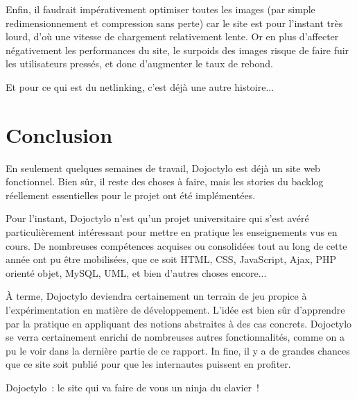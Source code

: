 \documentclass[a4paper,12pt]{article}
\begin{document}
Enfin, il faudrait impérativement optimiser toutes les images (par simple redimensionnement et compression sans perte) car le site est pour l'instant très lourd, d'où une vitesse de chargement relativement lente. Or en plus d'affecter négativement les performances du site, le surpoids des images risque de faire fuir les utilisateurs pressés, et donc d'augmenter le taux de rebond.

Et pour ce qui est du netlinking, c'est déjà une autre histoire...

\newpage


\part*{Conclusion}

En seulement quelques semaines de travail, Dojoctylo est déjà un site web fonctionnel. Bien sûr, il reste des choses à faire, mais les stories du backlog réellement essentielles pour le projet ont été implémentées.

Pour l'instant, Dojoctylo n'est qu'un projet universitaire qui s'est avéré particulièrement intéressant pour mettre en pratique les enseignements vus en cours. De nombreuses compétences acquises ou consolidées tout au long de cette année ont pu être mobilisées, que ce soit HTML, CSS, JavaScript, Ajax, PHP orienté objet, MySQL, UML, et bien d'autres choses encore...

À terme, Dojoctylo deviendra certainement un terrain de jeu propice à l'expérimentation en matière de développement. L'idée est bien sûr d'apprendre par la pratique en appliquant des notions abstraites à des cas concrets. Dojoctylo se verra certainement enrichi de nombreuses autres fonctionnalités, comme on a pu le voir dans la dernière partie de ce rapport. In fine, il y a de grandes chances que ce site soit publié pour que les internautes puissent en profiter.

Dojoctylo~: le site qui va faire de vous un ninja du clavier~!
\end{document}
